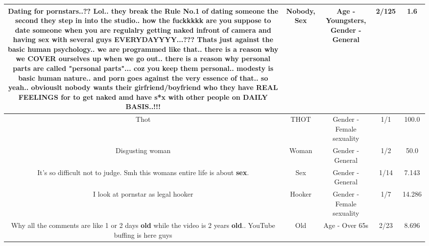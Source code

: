 \documentclass[11pt]{article}
\newlength\mylength
\begin{document}
\begin{center}
\begin{longtable}{|C{.65\mylength}|C{.30\mylength}|C{.12\mylength}|C{.12\mylength}|C{.12\mylength}|}
  \small Dating for pornstars..?? Lol.. they break the Rule No.1 of dating someone the second they step in into the studio.. how the fuckkkkk are you suppose to date someone when you are regulalry getting naked infront of camera and having \textbf{sex} with several guys EVERYDAYYYY...??? Thats just against the basic human psychology.. we are programmed like that.. there is a reason why we COVER ourselves up when we go out.. there is a reason why personal parts are called "personal parts"... coz you keep them personal.. modesty is basic human nature.. and porn goes against the very essence of that.. so yeah.. obviouslt \textbf{nobody} wants their girfriend/boyfriend  who they have REAL FEELINGS for to get naked amd have s*x with other people on DAILY BASIS..!!!\normalsize   & Nobody, Sex & Age - Youngsters, Gender - General & 2/125 & 1.6 \\  \hline
  \small Thot\normalsize   & THOT & Gender - Female sexuality & 1/1 & 100.0 \\  \hline
  \small Disgusting woman\normalsize   & Woman & Gender - General & 1/2 & 50.0 \\  \hline
  \small It's so difficult not to judge. Smh this womans entire life is about \textbf{sex}.\normalsize   & Sex & Gender - General & 1/14 & 7.143 \\  \hline
  \small I look at pornstar as legal hooker\normalsize   & Hooker & Gender - Female sexuality & 1/7 & 14.286 \\  \hline
  \small Why all the comments are like 1 or 2  days \textbf{old} while the video is 2 years \textbf{old}.. YouTube buffing is here guys\normalsize   & Old & Age - Over 65s & 2/23 & 8.696 \\  \hline

\end{longtable}
\end{center}
\end{document}
